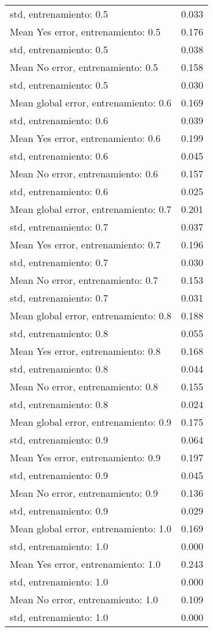 \begin{longtable}{p{4cm}|p{1.5cm}}
std, entrenamiento: 0.5               &     0.033 \\
Mean Yes error, entrenamiento: 0.5    &     0.176 \\
std, entrenamiento: 0.5               &     0.038 \\
Mean No error, entrenamiento: 0.5     &     0.158 \\
std, entrenamiento: 0.5               &     0.030 \\
Mean global error, entrenamiento: 0.6 &     0.169 \\
std, entrenamiento: 0.6               &     0.039 \\
Mean Yes error, entrenamiento: 0.6    &     0.199 \\
std, entrenamiento: 0.6               &     0.045 \\
Mean No error, entrenamiento: 0.6     &     0.157 \\
std, entrenamiento: 0.6               &     0.025 \\
Mean global error, entrenamiento: 0.7 &     0.201 \\
std, entrenamiento: 0.7               &     0.037 \\
Mean Yes error, entrenamiento: 0.7    &     0.196 \\
std, entrenamiento: 0.7               &     0.030 \\
Mean No error, entrenamiento: 0.7     &     0.153 \\
std, entrenamiento: 0.7               &     0.031 \\
Mean global error, entrenamiento: 0.8 &     0.188 \\
std, entrenamiento: 0.8               &     0.055 \\
Mean Yes error, entrenamiento: 0.8    &     0.168 \\
std, entrenamiento: 0.8               &     0.044 \\
Mean No error, entrenamiento: 0.8     &     0.155 \\
std, entrenamiento: 0.8               &     0.024 \\
Mean global error, entrenamiento: 0.9 &     0.175 \\
std, entrenamiento: 0.9               &     0.064 \\
Mean Yes error, entrenamiento: 0.9    &     0.197 \\
std, entrenamiento: 0.9               &     0.045 \\
Mean No error, entrenamiento: 0.9     &     0.136 \\
std, entrenamiento: 0.9               &     0.029 \\
Mean global error, entrenamiento: 1.0 &     0.169 \\
std, entrenamiento: 1.0               &     0.000 \\
Mean Yes error, entrenamiento: 1.0    &     0.243 \\
std, entrenamiento: 1.0               &     0.000 \\
Mean No error, entrenamiento: 1.0     &     0.109 \\
std, entrenamiento: 1.0               &     0.000 \\
\end{longtable}
